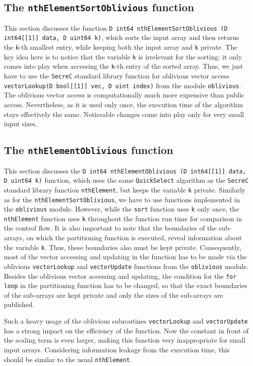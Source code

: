 \documentclass[11pt]{article}
\newcommand{\ct}[1]{\texttt{#1}}
\newcommand{\SC}{\ct{SecreC}\xspace}
\begin{document}
\subsection{The \ct{nthElementSortOblivious} function} %
\label{sub:the_nthelementsortoblivious_function}

This section discusses the function \ct{D int64 nthElementSortOblivious (D int64[[1]] data, D uint64 k)}, which sorts the input array and then returns the \ct{k}-th smallest entry, while keeping both the input array and \ct{k} private. The key idea here is to notice that the variable \ct{k} is irrelevant for the sorting: it only comes into play when accessing the \ct{k}-th entry of the sorted array. Thus, we just have to use the \SC standard library function for oblivious vector access \ct{vectorLookup(D bool[[1]] vec, D uint index)} from the module \ct{oblivious}. The oblivious vector access is computationally much more expensive than public access. Nevertheless, as it is used only once, the execution time of the algorithm stays effectively the same. Noticeable changes come into play only for very small input sizes.


\subsection{The \ct{nthElementOblivious} function} %
\label{sub:the_nthelementoblivious_function}

This section discusses the \ct{D int64 nthElementOblivious (D int64[[1]] data, D uint64 k)} function, which uses the same \ct{QuickSelect} algorithm as the \SC standard library function \ct{nthElement}, but keeps the variable \ct{k} private. Similarly as for the \ct{nthElementSortOblivious}, we have to use functions implemented in the \ct{oblivious} module. However, while the \ct{sort} function uses \ct{k} only once, the \ct{nthElement} function uses \ct{k} throughout the function run time for comparison in the control flow. It is also important to note that the boundaries of the sub-arrays, on which the partitioning function is executed, reveal information about the variable \ct{k}. Thus, these boundaries also must be kept private. Consequently, most of the vector accessing and updating in the function has to be made via the oblivious \ct{vectorLookup} and \ct{vectorUpdate} functions from the \ct{oblivious} module. Besides the oblivious vector accessing and updating, the condition for the \ct{for loop} in the partitioning function has to be changed, so that the exact boundaries of the sub-arrays are kept private and only the sizes of the sub-arrays are published. 

Such a heavy usage of the oblivious subroutines \ct{vectorLookup} and \ct{vectorUpdate} has a strong impact on the efficiency of the function. Now the constant in front of the scaling term is even larger, making this function very inappropriate for small input arrays. Considering information leakage from the execution time, this should be similar to the usual \ct{nthElement}. 


\end{document}
